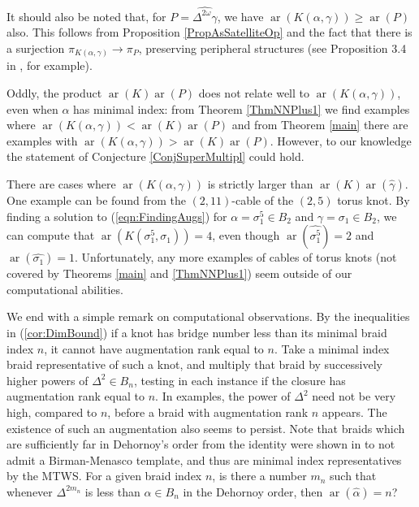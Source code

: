 \documentclass[11pt]{amsart}
\def\s{{\sigma}}
\def\ar{\operatorname{ar}}
\theoremstyle{definition}
\begin{document}
It should also be noted that, for $P=\widehat{\Delta^{2\omega}\gamma}$, we have $\ar(K(\alpha,\gamma))\ge \ar(P)$ also. This follows from Proposition \ref{PropAsSatelliteOp} and the fact that there is a surjection $\pi_{K(\alpha,\gamma)}\to\pi_P$, preserving peripheral structures (see Proposition 3.4 in \cite{SW}, for example). 

Oddly, the product $\ar(K)\ar(P)$ does not relate well to $\ar(K(\alpha,\gamma))$, even when $\alpha$ has minimal index: from Theorem \ref{ThmNNPlus1} we find examples where $\ar(K(\alpha,\gamma))<\ar(K)\ar(P)$ and from Theorem \ref{main} there are examples with $\ar(K(\alpha,\gamma))>\ar(K)\ar(P)$. However, to our knowledge the statement of Conjecture \ref{ConjSuperMultipl} could hold. 

There are cases where $\ar(K(\alpha,\gamma))$ is strictly larger than $\ar(K)\ar(\hat{\gamma})$. One example can be found from the $(2,11)$-cable of the $(2,5)$ torus knot. By finding a solution to (\ref{eqn:FindingAugs}) for $\alpha = \s_1^5\in B_2$ and $\gamma=\s_1\in B_2$, we can compute that $\ar(K(\s_1^5,\s_1)) = 4$, even though $\ar(\hat{\s_1^5})=2$ and $\ar(\hat{\s_1})=1$. Unfortunately, any more examples of cables of torus knots (not covered by Theorems \ref{main} and \ref{ThmNNPlus1}) seem outside of our computational abilities.

We end with a simple remark on computational observations. By the inequalities in (\ref{cor:DimBound}) if a knot has bridge number less than its minimal braid index $n$, it cannot have augmentation rank equal to $n$. Take a minimal index braid representative of such a knot, and multiply that braid by successively higher powers of $\Delta^2\in B_n$, testing in each instance if the closure has augmentation rank equal to $n$. In examples, the power of $\Delta^2$ need not be very high, compared to $n$, before a braid with augmentation rank $n$ appears. The existence of such an augmentation also seems to persist. Note that braids which are sufficiently far in Dehornoy's order from the identity were shown in \cite{MN} to not admit a Birman-Menasco template, and thus are minimal index representatives by the MTWS. For a given braid index $n$, is there a number $m_n$ such that whenever $\Delta^{2m_n}$ is less than $\alpha\in B_n$ in the Dehornoy order, then $\ar(\hat{\alpha}) = n$?



\end{document}
